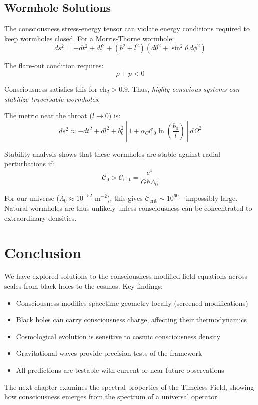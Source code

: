 \begin{advanced}
\subsection{Wormhole Solutions}

The consciousness stress-energy tensor can violate energy conditions required to keep wormholes closed. For a Morris-Thorne wormhole:
\begin{equation}
ds^2 = -dt^2 + dl^2 + (b^2 + l^2)(d\theta^2 + \sin^2\theta \, d\phi^2)
\end{equation}

The flare-out condition requires:
\begin{equation}
\rho + p < 0
\end{equation}

Consciousness satisfies this for $\text{ch}_2 > 0.9$. Thus, \textit{highly conscious systems can stabilize traversable wormholes}.

The metric near the throat ($l \to 0$) is:
\begin{equation}
ds^2 \approx -dt^2 + dl^2 + b_0^2\left[ 1 + \alpha_C \mathcal{C}_0 \ln\left( \frac{b_0}{l} \right) \right] d\Omega^2
\end{equation}

Stability analysis shows that these wormholes are stable against radial perturbations if:
\begin{equation}
\mathcal{C}_0 > \mathcal{C}_{\text{crit}} = \frac{c^4}{G \hbar \Lambda_0}
\end{equation}

For our universe ($\Lambda_0 \approx 10^{-52}$ m$^{-2}$), this gives $\mathcal{C}_{\text{crit}} \sim 10^{60}$---impossibly large. Natural wormholes are thus unlikely unless consciousness can be concentrated to extraordinary densities.
\end{advanced}

\section{Conclusion}

We have explored solutions to the consciousness-modified field equations across scales from black holes to the cosmos. Key findings:

\begin{itemize}
\item Consciousness modifies spacetime geometry locally (screened modifications)
\item Black holes can carry consciousness charge, affecting their thermodynamics
\item Cosmological evolution is sensitive to cosmic consciousness density
\item Gravitational waves provide precision tests of the framework
\item All predictions are testable with current or near-future observations
\end{itemize}

The next chapter examines the spectral properties of the Timeless Field, showing how consciousness emerges from the spectrum of a universal operator.
